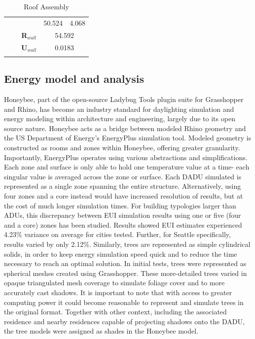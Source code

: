\documentclass[sagev,times,Review,doublespace]{sagej}
\begin{document}
\begin{table}[h!]
{\begin{tabular}{@{}lcccc@{}}
 &
  \multicolumn{1}{l}{} &
  \multicolumn{1}{l}{} &
  50.524 &
  4.068 \\ \cmidrule(l){3-5} 
 &
  \multicolumn{1}{l|}{} &
  \multicolumn{1}{c|}{\textbf{R$_{wall}$}} &
  \multicolumn{2}{c|}{54.592} \\ \cmidrule(l){3-5} 
 &
  \multicolumn{1}{l|}{} &
  \multicolumn{1}{c|}{\textbf{U$_{wall}$}} &
  \multicolumn{2}{c|}{0.0183} \\
 &
  \multicolumn{1}{l}{} &
  \multicolumn{1}{l}{} &
  \multicolumn{1}{l}{} &
  \multicolumn{1}{l}{} \\ \bottomrule
\end{tabular}%
}
\caption{Roof Assembly}
\label{table:roof-assembly}
\end{table}

\subsection{Energy model and analysis}
Honeybee, part of the open-source Ladybug Tools plugin suite for Grasshopper and Rhino, has become an industry standard for daylighting simulation and energy modeling within architecture and engineering, largely due to its open source nature\cite{mackey2018tool}. Honeybee acts as a bridge between modeled Rhino geometry and the US Department of Energy's EnergyPlus simulation tool. Modeled geometry is constructed as rooms and zones within Honeybee, offering greater granularity. Importantly, EnergyPlus operates using various abstractions and simplifications\cite{EnergyPlusTMVersionDocumentation2021}. Each zone and surface is only able to hold one temperature value at a time- each singular value is averaged across the zone or surface. Each DADU simulated is represented as a single zone spanning the entire structure. Alternatively, using four zones and a core instead would have increased resolution of results, but at the cost of much longer simulation times. For building typologies larger than ADUs, this discrepancy between EUI simulation results using one or five (four and a core) zones has been studied\cite{SingleZoneVs2018}. Results showed EUI estimates experienced 4.23\% variance on average for cities tested. Further, for Seattle specifically, results varied by only 2.12\%.
Similarly, trees are represented as simple cylindrical solids, in order to keep energy simulation speed quick and to reduce the time necessary to reach an optimal solution. In initial tests, trees were represented as spherical meshes created using Grasshopper. These more-detailed trees varied in opaque triangulated mesh coverage to simulate foliage cover and to more accurately cast shadows. It is important to note that with access to greater computing power it could become reasonable to represent and simulate trees in the original format. Together with other context, including the associated residence and nearby residences capable of projecting shadows onto the DADU, the tree models were assigned as shades in the Honeybee model. 
\end{document}

